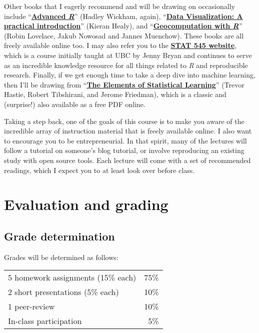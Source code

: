 \documentclass[12]{article}
\begin{document}
Other books that I eagerly recommend and will be drawing on occasionally include ``\href{http://adv-r.had.co.nz/}{\textbf{Advanced \textit{R}}}'' (Hadley Wickham, again), ``\href{http://socviz.co/}{\textbf{Data Visualization: A practical introduction}}'' (Kieran Healy), and ``\href{https://geocompr.robinlovelace.net/}{\textbf{Geocomputation with \textit{R}}}'' (Robin Lovelace, Jakub Nowosad and Jannes Muenchow). These books are all freely available online too. I may also refer you to the \href{http://stat545.com/topics.html}{\textbf{STAT 545 website}}, which is a course initially taught at UBC by Jenny Bryan and continues to serve as an incredible knowledge resource for all things related to \textit{R} and reproducible research. Finally, if we get enough time to take a deep dive into machine learning, then I'll be drawing from ``\href{https://web.stanford.edu/~hastie/ElemStatLearn/}{\textbf{The Elements of Statistical Learning}}'' (Trevor Hastie, Robert Tibshirani, and Jerome Friedman), which is a classic and (surprise!) also available as a free PDF online.

Taking a step back, one of the goals of this course is to make you aware of the incredible array of instruction material that is freely available online. I also want to encourage you to be entrepreneurial. In that spirit, many of the lectures will follow a tutorial on someone's blog tutorial, or involve reproducing an existing study with open source tools. Each lecture will come with a set of recommended readings, which I expect you to at least look over before class.

\section*{Evaluation and grading}

\subsection*{Grade determination}


Grades will be determined as follows:

\begin{table}[!h] \centering 
	\label{tab:grades} 
	\begin{tabularx}{0.5\textwidth}{Xr} 
		\toprule
		5 \times homework assignments (15\% each)	& 75\% \\
		2 \times short presentations (5\% each)		& 10\% \\
		1 \times peer-review						& 10\% \\
		In-class participation						& 5\% \\
		\bottomrule
	\end{tabularx} 
\end{table} 
\end{document}

